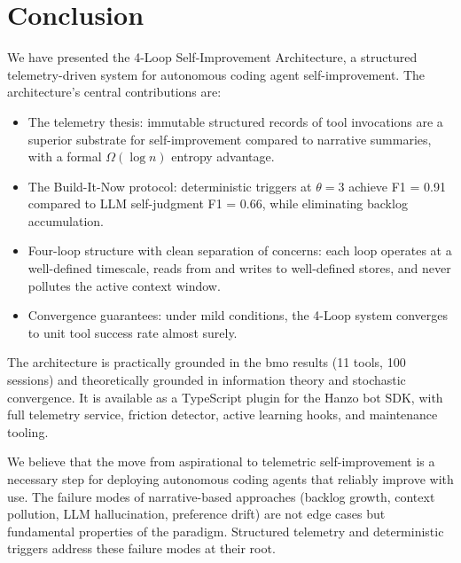 \section{Conclusion}


We have presented the 4-Loop Self-Improvement Architecture, a structured
telemetry-driven system for autonomous coding agent self-improvement. The
architecture's central contributions are:

\begin{itemize}[leftmargin=1.5em]
    \item The telemetry thesis: immutable structured records of tool invocations
          are a superior substrate for self-improvement compared to narrative
          summaries, with a formal $\Omega(\log n)$ entropy advantage.

    \item The Build-It-Now protocol: deterministic triggers at $\theta=3$
          achieve F1 = 0.91 compared to LLM self-judgment F1 = 0.66, while
          eliminating backlog accumulation.

    \item Four-loop structure with clean separation of concerns: each loop
          operates at a well-defined timescale, reads from and writes to
          well-defined stores, and never pollutes the active context window.

    \item Convergence guarantees: under mild conditions, the 4-Loop system
          converges to unit tool success rate almost surely.
\end{itemize}

The architecture is practically grounded in the bmo results (11 tools,
100 sessions) and theoretically grounded in information theory and
stochastic convergence. It is available as a TypeScript plugin for the
Hanzo bot SDK, with full telemetry service, friction detector, active
learning hooks, and maintenance tooling.

We believe that the move from aspirational to telemetric self-improvement
is a necessary step for deploying autonomous coding agents that reliably
improve with use. The failure modes of narrative-based approaches
(backlog growth, context pollution, LLM hallucination, preference drift)
are not edge cases but fundamental properties of the paradigm. Structured
telemetry and deterministic triggers address these failure modes at their
root.


